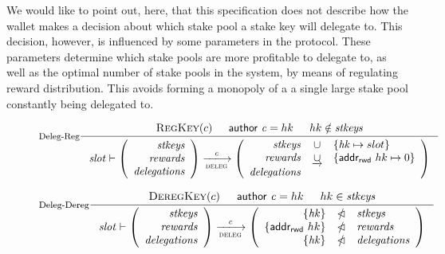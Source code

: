 We would like to point out, here, that this specification does not describe
how the wallet makes a decision about which stake pool a stake key will
delegate to. This decision, however, is influenced by some parameters in the
protocol. These parameters determine which stake pools are more profitable
to delegate to, as well as the optimal number of stake pools in the system,
by means of regulating reward distribution.
This avoids forming a monopoly of a a single large stake pool constantly
being delegated to.


\begin{figure}
  \centering
  \begin{equation}\label{eq:deleg-reg}
    \inference[Deleg-Reg]
    {
      \RegKey{c} & \cauthor{c} = hk & hk \notin \var{stkeys}
    }
    {
      \var{slot} \vdash
      \left(
      \begin{array}{r}
        \var{stkeys} \\
        \var{rewards} \\
        \var{delegations}
      \end{array}
      \right)
      \trans{deleg}{\var{c}}
      \left(
      \begin{array}{rcl}
        \var{stkeys} & \union & \{\var{hk} \mapsto slot\}\\
        \var{rewards} & \unionoverrideRight & \{\addrRw \var{hk} \mapsto 0\}\\
        \var{delegations}
      \end{array}
      \right)
    }
  \end{equation}

  \begin{equation}\label{eq:deleg-dereg}
    \inference[Deleg-Dereg]
    {
      \DeregKey{c} & \cauthor{c} = hk & hk \in \var{stkeys}
    }
    {
      \var{slot} \vdash
      \left(
      \begin{array}{r}
        \var{stkeys} \\
        \var{rewards} \\
        \var{delegations}
      \end{array}
      \right)
      \trans{deleg}{\var{c}}
      \left(
      \begin{array}{rcl}
        \{\var{hk}\} & \subtractdom & \var{stkeys}\\
        \{\addrRw \var{hk}\} & \subtractdom & \var{rewards} \\
        \{\var{hk}\} & \subtractdom & \var{delegations}
      \end{array}
      \right)
    }
  \end{equation}


\end{figure}
